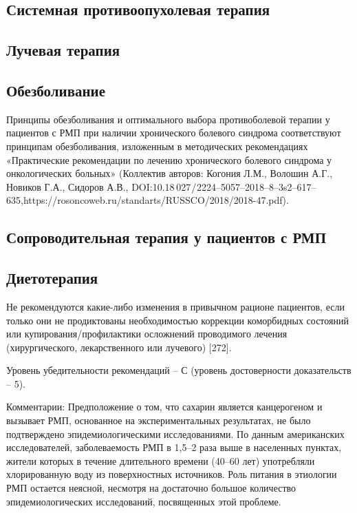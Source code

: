 \subsection{Системная противоопухолевая терапия}
\label{sec:}


\subsection{Лучевая терапия}
\label{sec:}


\subsection{Обезболивание}
\label{sec:}
Принципы обезболивания и оптимального выбора противоболевой терапии у пациентов с РМП при наличии хронического болевого синдрома соответствуют принципам обезболивания, изложенным в методических рекомендациях «Практические рекомендации по лечению хронического болевого синдрома у онкологических больных» (Коллектив авторов: Когония Л.М., Волошин А.Г., Новиков Г.А., Сидоров А.В., DOI:10.18 027 / 2224–5057–2018–8–3s2–617–635,https://rosoncoweb.ru/standarts/RUSSCO/2018/2018-47.pdf).

\subsection{Сопроводительная терапия у пациентов с РМП}
\label{sec:}


\subsection{Диетотерапия}
\label{sec:}
Не рекомендуются какие-либо изменения в привычном рационе пациентов, если только они не продиктованы необходимостью коррекции коморбидных состояний или купирования/профилактики осложнений проводимого лечения (хирургического, лекарственного или лучевого) [272].

Уровень убедительности рекомендаций – С (уровень достоверности доказательств – 5).

Комментарии: Предположение о том, что сахарин является канцерогеном и вызывает РМП, основанное на экспериментальных результатах, не было подтверждено эпидемиологическими исследованиями. По данным американских исследователей, заболеваемость РМП в 1,5–2 раза выше в населенных пунктах, жители которых в течение длительного времени (40–60 лет) употребляли хлорированную воду из поверхностных источников. Роль питания в этиологии РМП остается неясной, несмотря на достаточно большое количество эпидемиологических исследований, посвященных этой проблеме.
